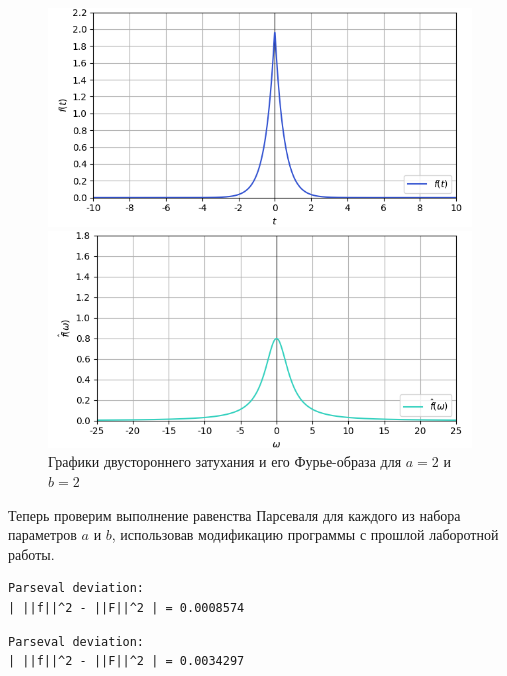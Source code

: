 \documentclass[a4paper]{article}
\begin{document}
\begin{figure}[H]
    \begin{minipage}{0.5\textwidth}
        \centering \includegraphics[width=\textwidth]{sources/5_fade/graph_3.png}
    \end{minipage}\hfill
    \begin{minipage}{0.5\textwidth}
        \centering \includegraphics[width=\textwidth]{sources/5_fade/fourier_3.png}
    \end{minipage}
    \caption{Графики двустороннего затухания и его Фурье-образа для $a = 2$ и $b = 2$} 
\end{figure}
\noindent Теперь проверим выполнение равенства Парсеваля для каждого из набора параметров $a$ и $b$, использовав модификацию программы с прошлой лаборотной работы.\\
\begin{minipage}{0.33\textwidth}
\begin{lstlisting}[caption={$a = 1$, $b = 1$}]
Parseval deviation:
| ||f||^2 - ||F||^2 | = 0.0008574
\end{lstlisting}
\end{minipage}\hfill
\begin{minipage}{0.33\textwidth}
\begin{lstlisting}[caption={$a = 2$, $b = 1$}, numbers=none]
Parseval deviation:
| ||f||^2 - ||F||^2 | = 0.0034297
\end{lstlisting}
\end{minipage}\hfill
\end{document}
